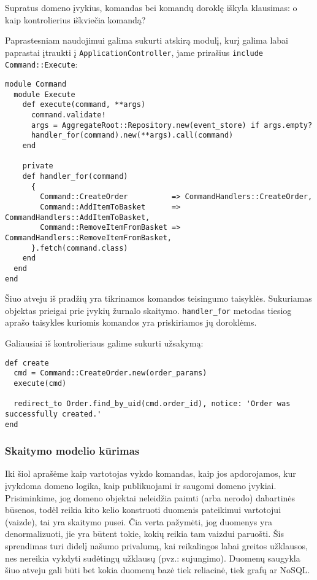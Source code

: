 Supratus domeno įvykius, komandas bei komandų doroklę iškyla klausimas: o kaip kontrolierius iškviečia komandą?

Paprastesniam naudojimui galima sukurti atskirą modulį, kurį galima labai paprastai įtraukti į \lstinline|ApplicationController|, jame prirašius \lstinline|include Command::Execute|:

\begin{lstlisting}
module Command
  module Execute
    def execute(command, **args)
      command.validate!
      args = AggregateRoot::Repository.new(event_store) if args.empty?
      handler_for(command).new(**args).call(command)
    end

    private
    def handler_for(command)
      {
        Command::CreateOrder          => CommandHandlers::CreateOrder,
        Command::AddItemToBasket      => CommandHandlers::AddItemToBasket,
        Command::RemoveItemFromBasket => CommandHandlers::RemoveItemFromBasket,
      }.fetch(command.class)
    end
  end
end
\end{lstlisting}

Šiuo atveju iš pradžių yra tikrinamos komandos teisingumo taisyklės. Sukuriamas objektas prieigai prie įvykių žurnalo skaitymo. \lstinline|handler_for| metodas tiesiog aprašo taisykles kuriomis komandos yra priskiriamos jų doroklėms.

Galiausiai iš kontrolieriaus galime sukurti užsakymą:

\begin{lstlisting}
def create
  cmd = Command::CreateOrder.new(order_params)
  execute(cmd)

  redirect_to Order.find_by_uid(cmd.order_id), notice: 'Order was successfully created.'
end
\end{lstlisting}

\subsubsection{Skaitymo modelio kūrimas}

Iki šiol aprašėme kaip vartotojas vykdo komandas, kaip jos apdorojamos, kur įvykdoma domeno logika, kaip publikuojami ir saugomi domeno įvykiai. Prisiminkime, jog domeno objektai neleidžia paimti (arba nerodo) dabartinės būsenos, todėl reikia kito kelio konstruoti duomenis pateikimui vartotojui (vaizde), tai yra skaitymo pusei. Čia verta pažymėti, jog duomenys yra denormalizuoti, jie yra būtent tokie, kokių reikia tam vaizdui paruošti. Šis sprendimas turi didelį našumo privalumą, kai reikalingos labai greitos užklausos, nes nereikia vykdyti sudėtingų užklausų (pvz.: sujungimo). Duomenų saugykla šiuo atveju gali būti bet kokia duomenų bazė tiek reliacinė, tiek grafų ar NoSQL.

